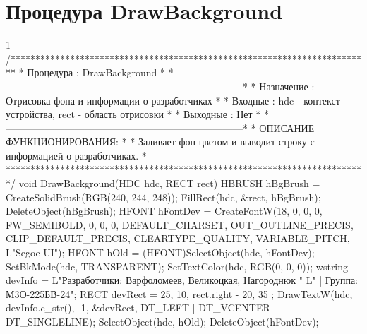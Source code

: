 \section{Процедура DrawBackground}
\footnotesize
\begin{listing}{1}
/*************************************************************************
* Процедура     : DrawBackground                                         *
*------------------------------------------------------------------------*
* Назначение    : Отрисовка фона и информации о разработчиках            *
* Входные       : hdc - контекст устройства, rect - область отрисовки    *
* Выходные      : Нет                                                    *
*------------------------------------------------------------------------*
* ОПИСАНИЕ ФУНКЦИОНИРОВАНИЯ:                                             *
* Заливает фон цветом и выводит строку с информацией о разработчиках.    *
*************************************************************************/
void DrawBackground(HDC hdc, RECT rect) {
    HBRUSH hBgBrush = CreateSolidBrush(RGB(240, 244, 248)); 
    FillRect(hdc, &rect, hBgBrush); 
    DeleteObject(hBgBrush);
    HFONT hFontDev = CreateFontW(18, 0, 0, 0, FW_SEMIBOLD, 0, 0, 0, DEFAULT_CHARSET,
		 OUT_OUTLINE_PRECIS, CLIP_DEFAULT_PRECIS,
 		 CLEARTYPE_QUALITY, VARIABLE_PITCH, L"Segoe UI");
    HFONT hOld = (HFONT)SelectObject(hdc, hFontDev); 
    SetBkMode(hdc, TRANSPARENT); SetTextColor(hdc, RGB(0, 0, 0));
    wstring devInfo = L"Разработчики: Варфоломеев, Великоцкая, Нагороднюк "
                      L"  |   Группа: М3О-225БВ-24";
    RECT devRect = { 25, 10, rect.right - 20, 35 }; 
    DrawTextW(hdc, devInfo.c_str(), -1, &devRect, 
              DT_LEFT | DT_VCENTER | DT_SINGLELINE);     
    SelectObject(hdc, hOld); DeleteObject(hFontDev);
}
\end{listing}
\normalsize

\pagebreak

